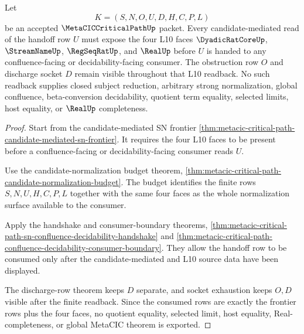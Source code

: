 \begin{theorem}
\label{thm:metacic-critical-path-candidate-mediated-frontier-l10-readback}
Let
$$
K=(S,N,O,U,D,H,C,P,L)
$$
be an accepted $\MetaCICCriticalPathUp$ packet. Every candidate-mediated read of the handoff row $U$ must expose the four L10 faces $\DyadicRatCoreUp$, $\StreamNameUp$, $\RegSeqRatUp$, and $\RealUp$ before $U$ is handed to any confluence-facing or decidability-facing consumer. The obstruction row $O$ and discharge socket $D$ remain visible throughout that L10 readback. No such readback supplies closed subject reduction, arbitrary strong normalization, global confluence, beta-conversion decidability, quotient term equality, selected limits, host equality, or $\RealUp$ completeness.
\end{theorem}
\begin{proof}
Start from the candidate-mediated SN frontier \autoref{thm:metacic-critical-path-candidate-mediated-sn-frontier}. It requires the four L10 faces to be present before a confluence-facing or decidability-facing consumer reads $U$.

Use the candidate-normalization budget theorem, \autoref{thm:metacic-critical-path-candidate-normalization-budget}. The budget identifies the finite rows $S,N,U,H,C,P,L$ together with the same four faces as the whole normalization surface available to the consumer.

Apply the handshake and consumer-boundary theorems, \autoref{thm:metacic-critical-path-sn-confluence-decidability-handshake} and \autoref{thm:metacic-critical-path-confluence-decidability-consumer-boundary}. They allow the handoff row to be consumed only after the candidate-mediated and L10 source data have been displayed.

The discharge-row theorem keeps $D$ separate, and socket exhaustion keeps $O,D$ visible after the finite readback. Since the consumed rows are exactly the frontier rows plus the four faces, no quotient equality, selected limit, host equality, Real-completeness, or global MetaCIC theorem is exported.
\end{proof}

